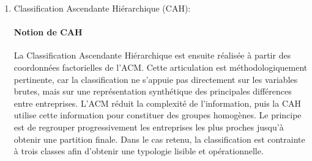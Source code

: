 \documentclass[12pt, a4paper, oneside]{report}
\begin{document}
\begin{enumerate}
	La correction s'applique exclusivement aux axes dont la valeur propre brute est supérieure au seuil d'exclusion $\frac{1}{p}$ (où $p$ est le nombre de variables qualitatives). Pour ces axes, la valeur propre corrigée $\tilde{\lambda}_s$ est définie par~:
	\begin{equation}
		\tilde{\lambda}_s = \left( \frac{p}{p - 1} \right)^2 \left( \lambda_s - \frac{1}{p} \right)^2 \quad \text{si } \lambda_s > \frac{1}{p}
		\label{eq:benzecri}
	\end{equation}
	Pour les axes dont $\lambda_s \le \frac{1}{p}$, la valeur propre corrigée est fixée à $0$. Le taux d'inertie corrigé $\tilde{\tau}_s$ devient alors beaucoup plus représentatif de la structure réelle des données~:
	\begin{equation}
		\tilde{\tau}_s = \frac{\tilde{\lambda}_s}{\sum_{s'=1}^{r} \tilde{\lambda}_{s'}}
		\label{eq:inertie_corrigee}
	\end{equation}
	\cite{dunod}
	\paragraph{Projection dans l'espace factoriel}
	Les coordonnées des individus (lignes) et des modalités (colonnes) dans le nouvel espace s'obtiennent à l'aide des matrices de projection $\mathbf{F}$ et $\mathbf{G}$~:
	\begin{equation}
		\mathbf{F} = \mathbf{D}_r^{-1/2}\,\mathbf{U}\,\boldsymbol{\Sigma}
		\label{eq:proj_individus}
	\end{equation}
	\begin{equation}
		\mathbf{G} = \mathbf{D}_c^{-1/2}\,\mathbf{V}\,\boldsymbol{\Sigma}
		\label{eq:proj_modalites}
	\end{equation}
	Ces coordonnées permettent la représentation simultanée des entreprises et de leurs caractéristiques (manquements et besoins) au sein d'un graphique biplot.
	
	\item Classification Ascendante Hiérarchique (CAH):
	
	\paragraph{Notion de CAH}
	La Classification Ascendante Hiérarchique est ensuite réalisée à partir des coordonnées factorielles de l’ACM. Cette articulation est méthodologiquement pertinente, car la classification ne s’appuie pas directement sur les variables brutes, mais sur une représentation synthétique des principales différences entre entreprises. L’ACM réduit la complexité de l’information, puis la CAH utilise cette information pour constituer des groupes homogènes. Le principe est de regrouper progressivement les entreprises les plus proches jusqu’à obtenir une partition finale. Dans le cas retenu, la classification est contrainte à trois classes afin d’obtenir une typologie lisible et opérationnelle.\\
	

\end{enumerate}
\end{document}
